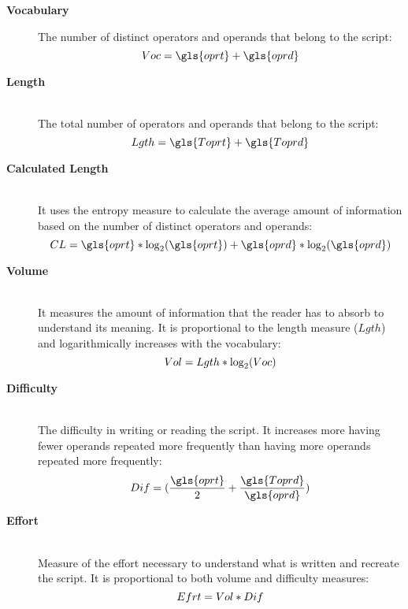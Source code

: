 \begin{description}
 	\item [\textbf{Vocabulary}] 
    	The number of distinct operators and operands that belong to the script:
        \begin{equation}
        \centering
        Voc = \gls{oprt} + \gls{oprd}
        \end{equation}
    
     \item [\textbf{Length}] \hfill \\
    	The total number of operators and operands that belong to the script:
        \begin{equation}
        	\centering
        	Lgth = \gls{Toprt} + \gls{Toprd}
        \end{equation}
        
     \item [\textbf{Calculated Length}] \hfill \\
    	It uses the entropy measure to calculate the average amount of information based on the number of distinct operators and operands:
        \begin{equation}
        	\centering
        	CL = \gls{oprt}*\log_2(\gls{oprt}) + \gls{oprd}*\log_2(\gls{oprd})
        \end{equation}
       
     \item [\textbf{Volume}] \hfill \\
    	It measures the amount of information that the reader has to absorb to understand its meaning. It is proportional to the length measure ($Lgth$) and logarithmically increases with the vocabulary:
        \begin{equation}
        	\centering
            Vol = Lgth*\log_2(Voc)
        \end{equation}
        
     \item [\textbf{Difficulty}] \hfill \\
    	The difficulty in writing or reading the script. It increases more having fewer operands repeated more frequently than having more operands repeated more frequently:
        \begin{equation}
        	\centering
            Dif = (\frac{\gls{oprt}}{2} + \frac{\gls{Toprd}}{\gls{oprd}})
        \end{equation}
        
	 \item [\textbf{Effort}] \hfill \\
    	Measure of the effort necessary to understand what is written and recreate the script. It is proportional to both volume and difficulty measures:
        \begin{equation}
        	\centering
        	Efrt = Vol*Dif
        \end{equation}
\end{description}


